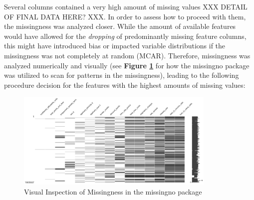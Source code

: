 Several columns contained a very high amount of missing values XXX DETAIL OF FINAL DATA HERE? XXX. In order to assess how to proceed with them, the missingness was analyzed closer. While the amount of available features would have allowed for the \textit{dropping} of predominantly missing feature columns, this might have introduced bias or impacted variable distributions if the missingness was not completely at random (MCAR).
Therefore, missingness was analyzed numerically and visually (see \textbf{Figure \ref{fig:CH03_OLD!_Missingno_Completeness}} for how the missingno package was utilized to scan for patterns in the missingness), leading to the following procedure decision for the features with the highest amounts of missing values:

\begin{figure}[h]
    \centering
    \includegraphics[width=0.85\textwidth]{images/CH03_OLD!_Missingno_Completeness.png}
    \caption{Visual Inspection of Missingness in the missingno package}
    \label{fig:CH03_OLD!_Missingno_Completeness}
\end{figure}

